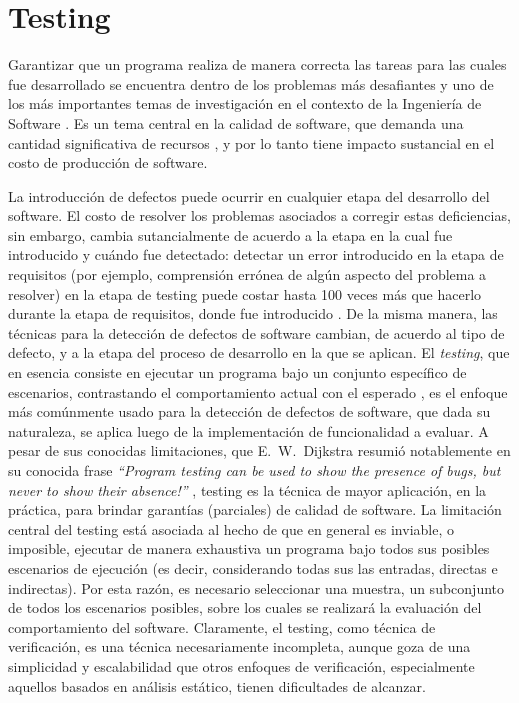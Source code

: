 \chapter[Testing]{Testing}
\label{cap:preliminares.testing}

Garantizar que un programa realiza de manera correcta las tareas para las cuales fue desarrollado se encuentra dentro de los problemas m\'as desafiantes y uno de los m\'as importantes temas de investigaci\'on en el contexto de la Ingenier\'ia de Software \cite{bibliography.books.GhezziBook,bibliography.books.PressmanBook,DBLP:series/txcs/Jalote05}. Es un tema central en la calidad de software, que demanda una cantidad significativa de recursos \cite{bibliography.books.JaloteBook}, y por lo tanto tiene impacto sustancial en el costo de producci\'on de software. 

La introducci\'on de defectos puede ocurrir en cualquier etapa del desarrollo del software. El costo de resolver los problemas asociados a corregir estas deficiencias, sin embargo, cambia sutancialmente de acuerdo a la etapa en la cual fue introducido y cu\'ando fue detectado: detectar un error introducido en la etapa de requisitos (por ejemplo, comprensi\'on err\'onea de alg\'un aspecto del problema a resolver) en la etapa de testing puede costar hasta 100 veces m\'as que hacerlo durante la etapa de requisitos, donde fue introducido \cite{bibliography.books.JaloteBook}. De la misma manera, las t\'ecnicas para la detecci\'on de defectos de software cambian, de acuerdo al tipo de defecto, y a la etapa del proceso de desarrollo en la que se aplican. El \emph{testing}, que en esencia consiste en ejecutar un programa bajo un conjunto espec\'ifico de escenarios, contrastando el comportamiento actual con el esperado \cite{bibliography.books.AmmannOffutt}, es el enfoque m\'as com\'unmente usado para la detecci\'on de defectos de software, que dada su naturaleza, se aplica luego de la implementaci\'on de funcionalidad a evaluar. A pesar de sus conocidas limitaciones, que E.~W.~Dijkstra resumi\'o notablemente en su conocida frase \emph{``Program testing can be used to show the presence of bugs, but never to show their absence!''} \cite{Dijkstra:1972:CIN:1243380.1243381}, testing es la t\'ecnica de mayor aplicaci\'on, en la pr\'actica, para brindar garant\'ias (parciales) de calidad de software. La limitaci\'on central del testing est\'a asociada al hecho de que en general es inviable, o imposible, ejecutar de manera exhaustiva un programa bajo todos sus posibles escenarios de ejecuci\'on (es decir, considerando todas sus las entradas, directas e indirectas). Por esta raz\'on, es necesario seleccionar una muestra, un subconjunto de todos los escenarios posibles, sobre los cuales se realizar\'a la evaluaci\'on del comportamiento del software. Claramente, el testing, como t\'ecnica de verificaci\'on, es una t\'ecnica necesariamente incompleta, aunque goza de una simplicidad y escalabilidad que otros enfoques de verificaci\'on, especialmente aquellos basados en an\'alisis est\'atico, tienen dificultades de alcanzar.


